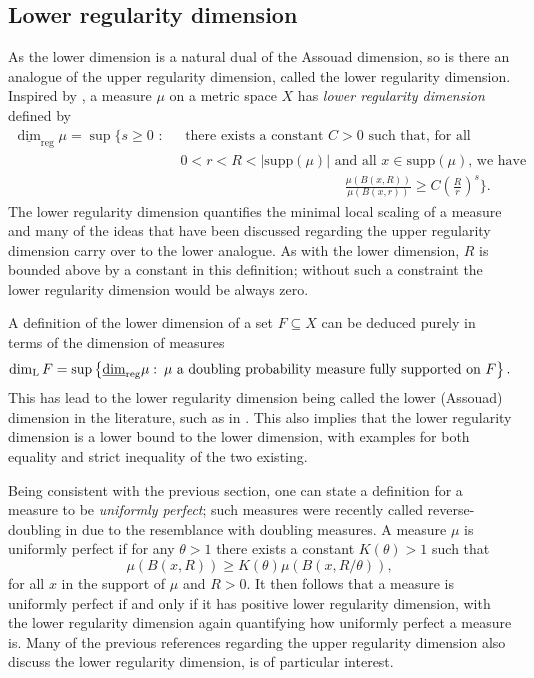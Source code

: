 \subsection{Lower regularity dimension}
\label{sec:intro-lower-reg}


As the lower dimension is a natural dual of the Assouad dimension, so is there an analogue of the upper regularity dimension, called the lower regularity dimension. Inspired by \cite{bylund}, a measure $\mu$ on a metric space $X$ has \textit{lower regularity dimension} defined by 
\begin{align*} 
\underline{\dim}_{\text{reg}} \mu = \sup \Bigg\{ s \geq 0 \, \,  : \,  &\,\text{ there exists a  constant }C  > 0\text{  such that, for all }  \\ & \, 0< r< R < \lvert \text{supp}(\mu)    \rvert \text{  and all $x \in \text{supp} (\mu)$, we have }  \\  & \hspace{5cm} \frac{\mu(B(x,R))}{\mu(B(x,r))} \geq C\left(\frac{R}{r}\right)^{s} \Bigg\}.
\end{align*}
The lower regularity dimension quantifies the minimal local scaling of a measure and many of the ideas that have been discussed regarding the upper regularity dimension carry over to the lower analogue. As with the lower dimension, $R$ is bounded above by a constant in this definition; without such a constraint the lower regularity dimension would be always zero.

A definition of the lower dimension of a set $F\subseteq X$ can be deduced purely in terms of the dimension of measures
\begin{equation}
    \dim_{\text{L}} F = \sup \left\{ \underline{\dim}_{\textup{reg}} \mu \,  \colon \, \mu \text{ a doubling probability measure fully supported on } F\right\}.
\end{equation}
This has lead to the lower regularity dimension being called the lower (Assouad) dimension in the literature, such as in \cite{hare-troscheit}. This also implies that the lower regularity dimension is a lower bound to the lower dimension, with examples for both equality and strict inequality of the two existing.

Being consistent with the previous section, one can state a definition for a measure to be \textit{uniformly perfect}; such measures were recently called reverse-doubling in \cite{anti2} due to the resemblance with doubling measures. A measure $\mu$ is uniformly perfect if for any $\theta > 1$ there exists a constant $K(\theta) > 1$ such that 
\[
\mu(B(x,R)) \ge K(\theta) \mu(B(x,R/\theta)),
\]
for all $x$ in the support of $\mu$ and $R > 0$. It then follows that a measure is uniformly perfect if and only if it has positive lower regularity dimension, with the lower regularity dimension again quantifying how uniformly perfect a measure is. Many of the previous references regarding the upper regularity dimension also discuss the lower regularity dimension, \cite{hare-troscheit} is  of particular interest.
